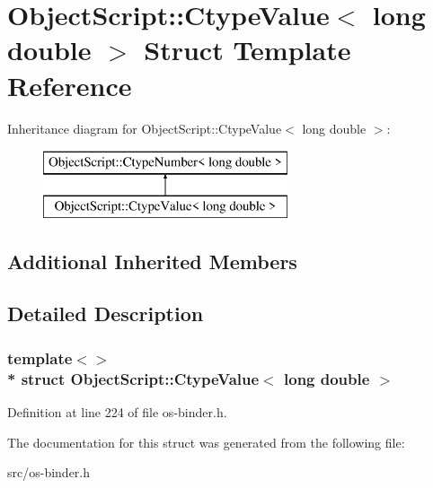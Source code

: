 \hypertarget{struct_object_script_1_1_ctype_value_3_01long_01double_01_4}{}\section{Object\+Script\+:\+:Ctype\+Value$<$ long double $>$ Struct Template Reference}
\label{struct_object_script_1_1_ctype_value_3_01long_01double_01_4}
Inheritance diagram for Object\+Script\+:\+:Ctype\+Value$<$ long double $>$\+:\begin{figure}[H]
\begin{center}
\leavevmode
\includegraphics[height=2.000000cm]{struct_object_script_1_1_ctype_value_3_01long_01double_01_4}
\end{center}
\end{figure}
\subsection*{Additional Inherited Members}


\subsection{Detailed Description}
\subsubsection*{template$<$$>$\\*
struct Object\+Script\+::\+Ctype\+Value$<$ long double $>$}



Definition at line 224 of file os-\/binder.\+h.



The documentation for this struct was generated from the following file\+:\begin{DoxyCompactItemize}
\item 
src/os-\/binder.\+h\end{DoxyCompactItemize}
